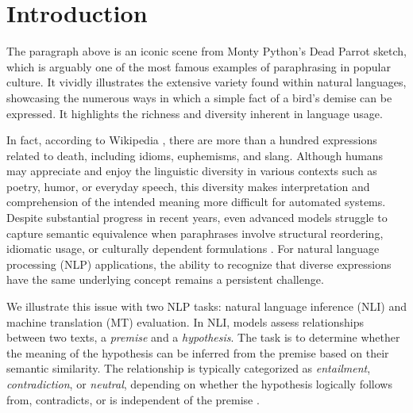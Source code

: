 \chapter{Introduction}
\label{preface}


The paragraph above is an iconic scene from Monty Python's Dead Parrot sketch, which is arguably one of the most famous examples of paraphrasing in popular culture. It vividly illustrates the extensive variety found within natural languages, showcasing the numerous ways in which a simple fact of a bird's demise can be expressed. It highlights the richness and diversity inherent in language usage.

In fact, according to Wikipedia \citep{wiki:death}, there are more than a hundred expressions related to death, including idioms, euphemisms, and slang. Although humans may appreciate and enjoy the linguistic diversity in various contexts such as poetry, humor, or everyday speech, this diversity makes interpretation and comprehension of the intended meaning more difficult for automated systems.  Despite substantial progress in recent years, even advanced models struggle to capture semantic equivalence when paraphrases involve structural reordering, idiomatic usage, or culturally dependent formulations \citep{michail-etal-2025-paraphrasus, zhou2024paraphraseidentificationdeeplearning}. For natural language processing (NLP) applications, the ability to recognize that diverse expressions have the same underlying concept remains a persistent challenge. 

We illustrate this issue with two NLP tasks: natural language inference (NLI) and machine translation (MT) evaluation. In NLI, models assess relationships between two texts, a \emph{premise} and a \emph{hypothesis}. The task is to determine whether the meaning of the hypothesis can be inferred from the premise based on their semantic similarity. The relationship is typically categorized as \emph{entailment}, \emph{contradiction}, or \emph{neutral}, depending on whether the hypothesis logically follows from, contradicts, or is independent of the premise \citep{dagan:2005}.

